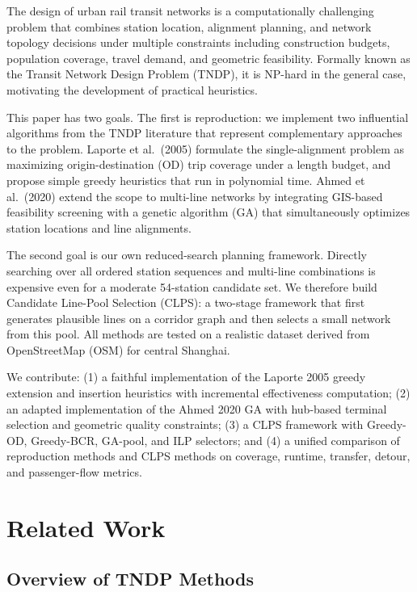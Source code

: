 \documentclass[conference]{IEEEtran}
\begin{document}
The design of urban rail transit networks is a computationally challenging
problem that combines station location, alignment planning, and network
topology decisions under multiple constraints including construction
budgets, population coverage, travel demand, and geometric feasibility.
Formally known as the Transit Network Design Problem (TNDP), it is NP-hard
in the general case, motivating the development of practical heuristics.

This paper has two goals. The first is reproduction: we implement two
influential algorithms from the TNDP literature that represent
complementary approaches to the problem. Laporte et al.\ (2005) formulate
the single-alignment problem as maximizing origin-destination (OD) trip
coverage under a length budget, and propose simple greedy heuristics that
run in polynomial time. Ahmed et al.\ (2020) extend the scope to multi-line
networks by integrating GIS-based feasibility screening with a genetic
algorithm (GA) that simultaneously optimizes station locations and line
alignments.

The second goal is our own reduced-search planning framework. Directly
searching over all ordered station sequences and multi-line combinations is
expensive even for a moderate 54-station candidate set. We therefore build
Candidate Line-Pool Selection (CLPS): a two-stage framework that first
generates plausible lines on a corridor graph and then selects a small
network from this pool. All methods are tested on a realistic dataset
derived from OpenStreetMap (OSM) for central Shanghai.

We contribute: (1) a faithful implementation of the Laporte 2005 greedy
extension and insertion heuristics with incremental effectiveness
computation; (2) an adapted implementation of the Ahmed 2020 GA with
hub-based terminal selection and geometric quality constraints; (3) a CLPS
framework with Greedy-OD, Greedy-BCR, GA-pool, and ILP selectors; and (4) a
unified comparison of reproduction methods and CLPS methods on coverage,
runtime, transfer, detour, and passenger-flow metrics.

\section{Related Work}

\subsection{Overview of TNDP Methods}
\end{document}
